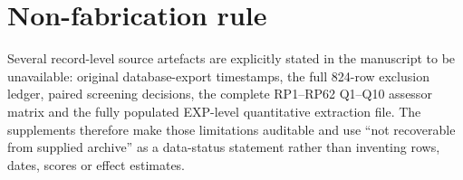 \documentclass[10pt]{article}
\begin{document}
\section*{Non-fabrication rule}
Several record-level source artefacts are explicitly stated in the manuscript to be unavailable: original database-export timestamps, the full 824-row exclusion ledger, paired screening decisions, the complete RP1--RP62 Q1--Q10 assessor matrix and the fully populated EXP-level quantitative extraction file. The supplements therefore make those limitations auditable and use ``not recoverable from supplied archive'' as a data-status statement rather than inventing rows, dates, scores or effect estimates.
\end{document}

